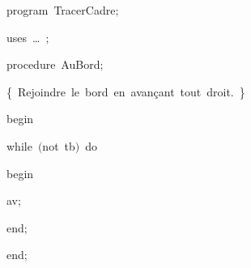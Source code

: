 
{
\parindent {}
\medskip

\carrenoir
\vspace{\neglskip}\mbox{\blc  \idt  \mcl program\idt \ TracerCadre$;$
}\par 
\vspace{\neglskip}\mbox{\blc \blk\idt \mcl uses\idt \ \ldots\ $;$
}\par 
\medskip

\pagebreak[3] 
\vspace{\neglskip}\mbox{\blc  \blk\idt  \mcl procedure\idt \ AuBord$;$}\par 
\vspace{\neglskip}\mbox{\blc  \blk\blk\idt  \cmt  \{\ Rejoindre\ le\ bord\ en\ avançant\ tout\ droit.\ \}\idt }\par 
\vspace{\neglskip}\mbox{\blc  \blk\idt  \mcl begin\idt }\par 
\pagebreak[3] 
\vspace{\neglskip}\mbox{\blc  \blk\blk\idt  \mcl while\idt \ $($\mcl not\idt \ tb$)$\ \mcl do\idt }\par 
\vspace{\neglskip}\mbox{\blc  \blk\blk\blk\idt  \mcl begin\idt }\par 
\vspace{\neglskip}\mbox{\blc  \blk\blk\blk\blk\idt  av$;$}\par 
\vspace{\neglskip}\mbox{\blc  \blk\blk\blk\idt  \mcl end\idt $;$}\par 
\vspace{\neglskip}\mbox{\blc  \blk\idt  \mcl end\idt $;$}\par 
\medskip

}
